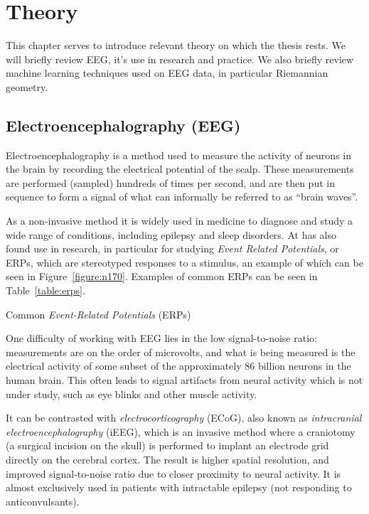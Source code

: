 \chapter{Theory}

This chapter serves to introduce relevant theory on which the thesis rests. We will briefly review EEG, it's use in research and practice. We also briefly review machine learning techniques used on EEG data, in particular Riemannian geometry.

\section{Electroencephalography (EEG)}\label{eeg-theory}

    Electroencephalography is a method used to measure the activity of neurons in the brain by recording the electrical potential of the scalp. These measurements are performed (sampled) hundreds of times per second, and are then put in sequence to form a signal of what can informally be referred to as ``brain waves''. 

    As a non-invasive method it is widely used in medicine to diagnose and study a wide range of conditions, including epilepsy and sleep disorders. 
    At has also found use in research, in particular for studying \emph{Event Related Potentials}, or ERPs, which are stereotyped responses to a stimulus, an example of which can be seen in Figure~\ref{figure:n170}. Examples of common ERPs can be seen in Table~\ref{table:erps}.

    \begin{table}
        \centering
        
        \caption{Common \emph{Event-Related Potentials} (ERPs)}\label{table:erps}
    \end{table}

    

    One difficulty of working with EEG lies in the low signal-to-noise ratio: measurements are on the order of microvolts, and what is being measured is the electrical activity of some subset of the approximately 86 billion neurons in the human brain. This often leads to signal artifacts from neural activity which is not under study, such as eye blinks and other muscle activity.

    It can be contrasted with \emph{electrocorticography} (ECoG), also known as \emph{intracranial electroencephalography} (iEEG), which is an invasive method where a craniotomy (a surgical incision on the skull) is performed to implant an electrode grid directly on the cerebral cortex. The result is higher spatial resolution, and improved signal-to-noise ratio due to closer proximity to neural activity. It is almost exclusively used in patients with intractable epilepsy (not responding to anticonvulsants).


